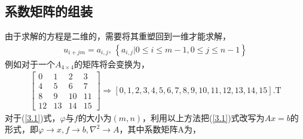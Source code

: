 \documentclass{article} %
\begin{document}
\subsection{系数矩阵的组装}
由于求解的方程是二维的，需要将其重塑回到一维才能求解，
\begin{align}
    u_{i+jm}=a_{i,j},\, \left\{a_{i,j}|0\leq i\leq m-1,0\leq j\leq n-1\right\}
\end{align}
例如对于一个$A_{4\times 4}$的矩阵将会变换为，
\begin{align}
    \begin{bmatrix}
        0  & 1  & 2  & 3  \\
        4  & 5  & 6  & 7  \\
        8  & 9  & 10 & 11 \\
        12 & 13 & 14 & 15
    \end{bmatrix}
    \Rightarrow
    \left[0,1,2,3,4,5,6,7,8,9,10,11,12,13,14,15\right].\mathrm{T}
\end{align}
对于(\ref{3.1})式，$\varphi$与$f$的大小为$(m,n)$，利用以上方法把(\ref{3.1})式改写为$Ax=b$的形式，即$\varphi \rightarrow x, f \rightarrow b ,\nabla^2 \rightarrow A$，其中系数矩阵A为，
\end{document}
